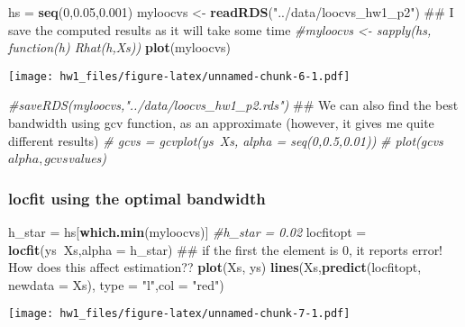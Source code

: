 \documentclass[]{article}
\newenvironment{Shaded}{\begin{snugshade}}{\end{snugshade}}
\newcommand{\KeywordTok}[1]{\textcolor[rgb]{0.13,0.29,0.53}{\textbf{#1}}}
\newcommand{\DataTypeTok}[1]{\textcolor[rgb]{0.13,0.29,0.53}{#1}}
\newcommand{\DecValTok}[1]{\textcolor[rgb]{0.00,0.00,0.81}{#1}}
\newcommand{\FloatTok}[1]{\textcolor[rgb]{0.00,0.00,0.81}{#1}}
\newcommand{\StringTok}[1]{\textcolor[rgb]{0.31,0.60,0.02}{#1}}
\newcommand{\CommentTok}[1]{\textcolor[rgb]{0.56,0.35,0.01}{\textit{#1}}}
\newcommand{\OperatorTok}[1]{\textcolor[rgb]{0.81,0.36,0.00}{\textbf{#1}}}
\newcommand{\NormalTok}[1]{#1}
\begin{document}
\begin{Shaded}
\begin{Highlighting}[]
\NormalTok{hs =}\StringTok{ }\KeywordTok{seq}\NormalTok{(}\DecValTok{0}\NormalTok{,}\FloatTok{0.05}\NormalTok{,}\FloatTok{0.001}\NormalTok{)}
\NormalTok{myloocvs <-}\StringTok{ }\KeywordTok{readRDS}\NormalTok{(}\StringTok{"../data/loocvs_hw1_p2"}\NormalTok{) ## I save the computed results as it will take some time}
\CommentTok{#myloocvs <- sapply(hs, function(h) Rhat(h,Xs)) }
\KeywordTok{plot}\NormalTok{(myloocvs)}
\end{Highlighting}
\end{Shaded}

\texttt{[image: hw1\_files/figure-latex/unnamed-chunk-6-1.pdf]}

\begin{Shaded}
\begin{Highlighting}[]
\CommentTok{#saveRDS(myloocvs,"../data/loocvs_hw1_p2.rds")}
\NormalTok{## We can also find the best bandwidth using gcv function, as an approximate (however, it gives me quite different results)}
\CommentTok{# gcvs = gcvplot(ys~Xs, alpha = seq(0,0.5,0.01))}
\CommentTok{# plot(gcvs$alpha, gcvs$values)}
\end{Highlighting}
\end{Shaded}

\subsubsection{locfit using the optimal
bandwidth}\label{locfit-using-the-optimal-bandwidth}

\begin{Shaded}
\begin{Highlighting}[]
\NormalTok{h_star =}\StringTok{ }\NormalTok{hs[}\KeywordTok{which.min}\NormalTok{(myloocvs)]}
\CommentTok{#h_star = 0.02}
\NormalTok{locfitopt =}\StringTok{ }\KeywordTok{locfit}\NormalTok{(ys}\OperatorTok{~}\NormalTok{Xs,}\DataTypeTok{alpha =}\NormalTok{ h_star) ## if the first the element is 0, it reports error! How does this affect estimation??}
\KeywordTok{plot}\NormalTok{(Xs, ys)}
\KeywordTok{lines}\NormalTok{(Xs,}\KeywordTok{predict}\NormalTok{(locfitopt, }\DataTypeTok{newdata =}\NormalTok{ Xs), }\DataTypeTok{type =} \StringTok{"l"}\NormalTok{,}\DataTypeTok{col =} \StringTok{"red"}\NormalTok{)}
\end{Highlighting}
\end{Shaded}

\texttt{[image: hw1\_files/figure-latex/unnamed-chunk-7-1.pdf]}
\end{document}
